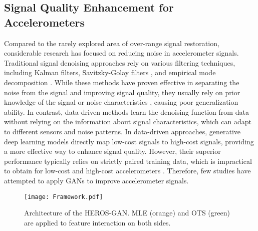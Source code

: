 \subsection{Signal Quality Enhancement for Accelerometers}
Compared to the rarely explored area of over-range signal restoration, considerable research has focused on reducing noise in accelerometer signals.
Traditional signal denoising approaches rely on various filtering techniques, including Kalman filters, Savitzky-Golay filters \cite{8713728}, and empirical mode decomposition \cite{liu2020denoising}. While these methods have proven effective in separating the noise from the signal and improving signal quality, they usually rely on prior knowledge of the signal or noise characteristics \cite{skog2009car}, causing poor generalization ability.
In contrast, data-driven methods learn the denoising function from data without relying on the information about signal characteristics, which can adapt to different sensors and noise patterns.
In data-driven approaches, generative deep learning models directly map low-cost signals to high-cost signals, providing a more effective way to enhance signal quality. However, their superior performance typically relies on strictly paired training data, which is impractical to obtain for low-cost and high-cost accelerometers \cite{wu2019survey}.
Therefore, few studies have attempted to apply GANs to improve accelerometer signals. 



\begin{figure*}[t]
	\centering
	\texttt{[image: Framework.pdf]} %
	\caption{Architecture of the HEROS-GAN. MLE (orange) and OTS (green) are applied to feature interaction on both sides.}
	\label{Framework of HEROS-GAN}
\end{figure*}